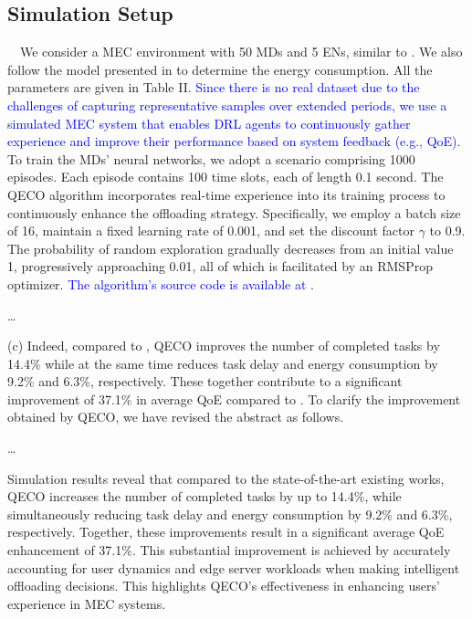\documentclass[12pt,draftclsnofoot,onecolumn]{IEEEtran}
\newcommand{\rev}[1]{{\color{blue}#1}} %
\newcommand{\rev}[1]{#1}
\newenvironment{my}[2]%
{\begin{list}{}%
{\setlength{\rightmargin}{#1}\setlength{\leftmargin}{#2}}%


 \item[]{}

} {\end{list}}
\begin{document}
\begin{enumerate}
\begin{my}{1cm}{1cm}
{{\subsection{Simulation Setup}
\,\,\,\, We consider a MEC environment with 50 MDs and 5 ENs, similar to \cite{9253665}. We also follow the model presented in \cite{zhou2021deep} to determine the energy consumption. All the parameters are given in Table II. \textcolor{blue}{Since there is no real dataset due to the challenges of capturing representative samples over extended periods, we use a simulated MEC system that enables DRL agents to continuously gather experience and improve their performance based on system feedback (e.g., QoE).} To train the MDs' neural networks, we adopt a scenario comprising 1000 episodes. Each episode contains 100 time slots, each of length 0.1 second. The QECO algorithm incorporates real-time experience into its training process to continuously enhance the offloading strategy. Specifically, we employ a batch size of 16, maintain a fixed learning rate of 0.001, and set the discount factor $\gamma$ to 0.9. The probability of random exploration gradually decreases from an initial value 1, progressively approaching 0.01, all of which is facilitated by an RMSProp optimizer. \textcolor{blue}{The algorithm's source code is available at \cite{QECO}}. 


\color{blue}
\dots 

}}

\end{my}


\vspace{6mm}

(c) Indeed, compared to \cite{yang2018distributed}, QECO improves the number of completed tasks by 14.4\% while at the same time reduces task delay and energy consumption by 9.2\% and 6.3\%, respectively. These together contribute to a significant improvement of 37.1\% in average QoE compared to \cite{yang2018distributed}. To clarify the improvement obtained by QECO, we have revised the abstract as follows. \vspace{4mm}




		\begin{my}{1cm}{1cm}
	\rev{
 	\dots 
 	
					Simulation results reveal that compared to the state-of-the-art existing works, QECO increases the number of completed tasks by up to 14.4\%, while simultaneously reducing task delay and energy consumption by 9.2\% and 6.3\%, respectively. Together, these improvements result in a significant average QoE enhancement of 37.1\%. This substantial improvement is achieved by accurately accounting for user dynamics and edge server workloads when making intelligent offloading decisions. This highlights QECO's effectiveness in enhancing users' experience in MEC systems.}


\end{my}
\end{enumerate}
\end{document}
